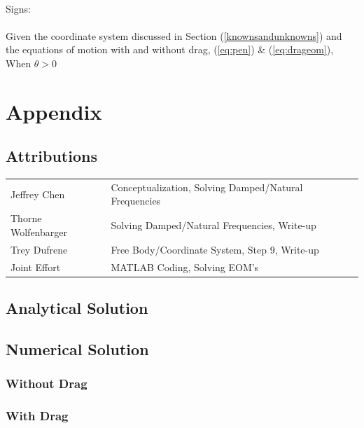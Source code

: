 \documentclass[12pt]{report}
\begin{document}
\begin{flushleft}
~\\
Signs: \\
~\\
Given the coordinate system discussed in Section (\ref{knownsandunknowns}) and the
equations of motion with and without drag, (\ref{eq:pen}) \& (\ref{eq:drageom}), \\
When $\theta > 0$
\newpage
\section{Appendix} \label{appendix}

\subsection{Attributions}

\onehalfspacing
\begin{tabular}{ll}
Jeffrey Chen & Conceptualization, Solving Damped/Natural Frequencies\\
Thorne Wolfenbarger & Solving Damped/Natural Frequencies, Write-up\\
Trey Dufrene & Free Body/Coordinate System, Step 9, Write-up\\
Joint Effort & MATLAB Coding, Solving EOM's
\end{tabular}
\singlespacing

\subsection{Analytical Solution}

\newpage

\subsection{Numerical Solution} \label{appendix:numerical}
\subsubsection{Without Drag}

\newpage
\subsubsection{With Drag}


\end{flushleft}
\end{document}
